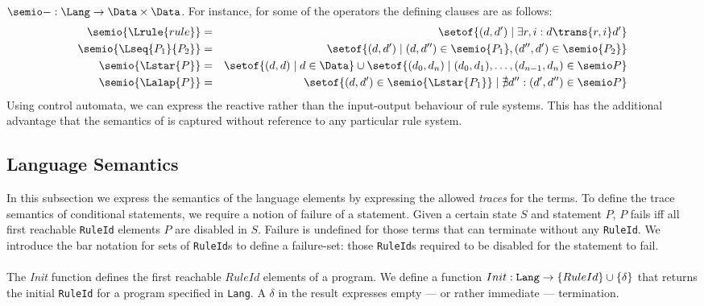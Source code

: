 $\semio-:\Lang\rightarrow \Data\times \Data$. For instance, for some of the
operators the defining clauses are as follows:
%
\begin{eqnarray*}
\semio{\Lrule{rule}}
   & = & \setof{(d,d')\mid \exists r,i: d\trans{r,i} d'} \\
\semio{\Lseq{P_1}{P_2}}
   & = & \setof{(d,d')\mid
                (d,d'')\in \semio{P_1}, (d'',d')\in \semio{P_2}} \\
\semio{\Lstar{P}}
   & = & \setof{(d,d) \mid d\in \Data} \cup
         \setof{(d_0,d_n)\mid (d_0,d_1),\ldots,(d_{n-1},d_n)\in \semio P} \\
\semio{\Lalap{P}}
   & = & \setof{(d,d')\in \semio{\Lstar{P_1}} \mid
                          \nexists d'': (d',d'')\in \semio P} 
\end{eqnarray*}
%
Using control automata, we can express the reactive rather than the
input-output behaviour of rule systems. This has the additional advantage that
the semantics of is captured without reference to any particular rule system.

\iffull

\subsection{Language Semantics}
In this subsection we express the semantics of the language elements by expressing the allowed \emph{traces} for the terms. To define the trace semantics of conditional statements, we require a notion of failure of a statement. Given a certain state $S$ and statement $P$, $P$ fails iff all first reachable {\tt RuleId} elements $P$ are disabled in $S$. Failure is undefined for those terms that can terminate without any {\tt RuleId}. We introduce the bar notation for sets of {\tt RuleId}s to define a failure-set: those {\tt RuleId}s required to be disabled for the statement to fail.\\
\\
The \emph{Init} function defines the first reachable $RuleId$ elements of a program.
We define a function $Init: \text{\tt Lang} \rightarrow \{ RuleId \} \cup \{ \delta \}$ that returns the initial {\tt RuleId} for a program specified in {\tt Lang}. A $\delta$ in the result expresses empty --- or rather immediate --- termination.

